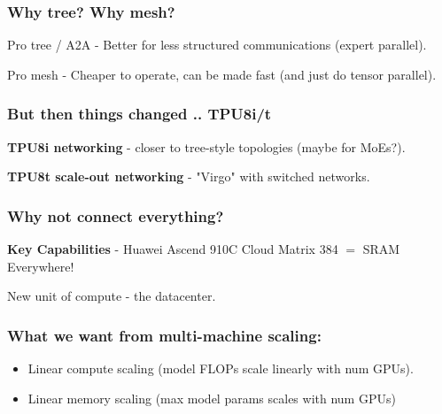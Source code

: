 \documentclass[12pt,twoside]{article}
\begin{document}
\subsubsection*{Why tree? Why mesh?}

\begin{center}
    Pro tree / A2A - Better for less structured communications (expert parallel).
\end{center}

\begin{center}
    Pro mesh - Cheaper to operate, can be made fast (and just do tensor parallel).
\end{center}

\subsubsection*{But then things changed .. TPU8i/t}

\begin{center}
    \textbf{TPU8i networking} - closer to tree-style topologies (maybe for MoEs?).
\end{center}

\begin{center}
    \textbf{TPU8t scale-out networking} - "Virgo" with switched networks.
\end{center}

\subsubsection*{Why not connect everything?}

\begin{center}
    \textbf{Key Capabilities} - Huawei Ascend 910C Cloud Matrix 384 \(=\) SRAM Everywhere!
\end{center}

\begin{center}
    New unit of compute - the datacenter.
\end{center}

\subsubsection*{What we want from multi-machine scaling:}

\begin{itemize}
    \item Linear compute scaling (model FLOPs scale linearly with num GPUs).
    \item Linear memory scaling (max model params scales with num GPUs) 
\end{itemize}
\end{document}
